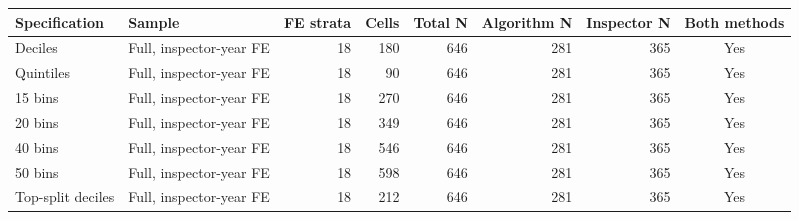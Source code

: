 \begin{tabular}{llrrrrrc}
\toprule
Specification & Sample & FE strata & Cells & Total N & Algorithm N & Inspector N & Both methods \\
\midrule
Deciles & Full, inspector-year FE & 18 & 180 & 646 & 281 & 365 & Yes \\
Quintiles & Full, inspector-year FE & 18 & 90 & 646 & 281 & 365 & Yes \\
15 bins & Full, inspector-year FE & 18 & 270 & 646 & 281 & 365 & Yes \\
20 bins & Full, inspector-year FE & 18 & 349 & 646 & 281 & 365 & Yes \\
40 bins & Full, inspector-year FE & 18 & 546 & 646 & 281 & 365 & Yes \\
50 bins & Full, inspector-year FE & 18 & 598 & 646 & 281 & 365 & Yes \\
Top-split deciles & Full, inspector-year FE & 18 & 212 & 646 & 281 & 365 & Yes \\
\bottomrule
\end{tabular}
